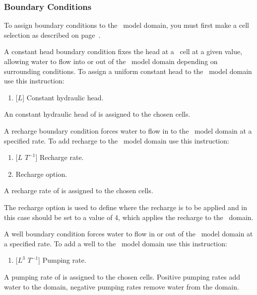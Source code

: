 \subsubsection{Boundary Conditions}  
To assign boundary conditions  to the \swf\ model domain, you must first make a cell selection as described on page~\pageref{page:cellSelect}.

A constant head boundary condition fixes the head at a \swf\ cell at a given value, allowing water to flow into or out of the \swf\ model domain depending on surrounding conditions.    To assign a uniform constant head to the \swf\ model domain use this instruction:

    {
        \squish
        \begin{enumerate}
        \item {} [$L$]  Constant hydraulic head.
        \end{enumerate}
          An constant hydraulic head  of  is assigned to the chosen cells.
    }

A recharge boundary condition forces  water to flow in to the \swf\ model domain at a specified rate.   To add recharge  to the \swf\ model domain use this instruction:

    {
        \squish
        \begin{enumerate}
            \item {} [$L$ $T^{-1}$] Recharge rate.
            \item {}  Recharge option.
        \end{enumerate}
        A recharge rate of  is assigned to the chosen cells.

        The recharge option  is used to define where the recharge is to be applied and in this case should be set to a value of 4, which applies the recharge to the \swf\ domain.
    }

A well boundary condition forces  water to flow in or out of the \swf\ model domain at a specified rate.   To add a well  to the \swf\ model domain use this instruction:

    {
        \squish
        \begin{enumerate}
            \item {} [$L^{3}$ $T^{-1}$]  Pumping rate.
        \end{enumerate}
        A pumping  rate of  is assigned to the chosen cells.  Positive pumping rates add water to the domain, negative pumping rates remove water from the domain.
    }

